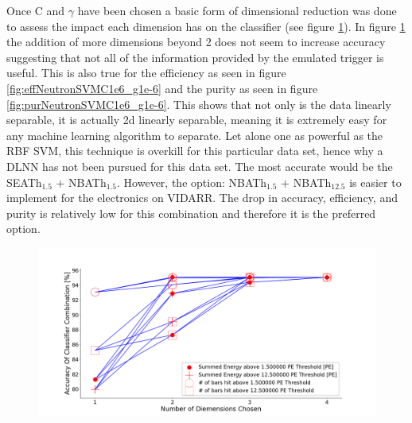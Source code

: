 Once C and $\gamma$ have been chosen a basic form of dimensional reduction was done to assess the impact each dimension has on the classifier (see figure \ref{fig:accNeutronSVMC1e6_g1e-6}). In figure \ref{fig:accNeutronSVMC1e6_g1e-6} the addition of more dimensions beyond 2 does not seem to increase accuracy suggesting that not all of the information provided by the emulated trigger is useful. This is also true for the efficiency as seen in figure \ref{fig:effNeutronSVMC1e6_g1e-6} and the purity as seen in figure \ref{fig:purNeutronSVMC1e6_g1e-6}. This shows that not only is the data linearly separable, it is actually 2d linearly separable, meaning it is extremely easy for any machine learning algorithm to separate. Let alone one as powerful as the RBF SVM, this technique is overkill for this particular data set, hence why a DLNN has not been pursued for this data set. The most accurate would be the SEATh$_{1.5}$ + NBATh$_{1.5}$. However, the option: NBATh$_{1.5}$ + NBATh$_{12.5}$ is easier to implement for the electronics on VIDARR. The drop in accuracy, efficiency, and purity is relatively low for this combination and therefore it is the preferred option. 

\begin{figure}[!h]
\centering
\includegraphics[width=0.8\linewidth]{Chapter4/Figs/Raster/accNeutronSVMC1e6_g1e-6.png}
\label{fig:accNeutronSVMC1e6_g1e-6}
\end{figure}

